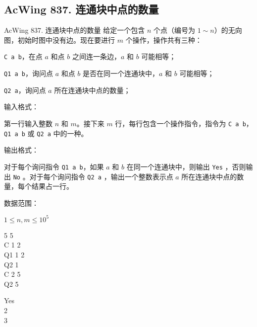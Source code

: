 \subsection{AcWing 837. 连通块中点的数量}

\begin{titledbox}{AcWing 837. 连通块中点的数量}
给定一个包含 $n$ 个点（编号为 $1 \sim n$）的无向图，初始时图中没有边。现在要进行 $m$ 个操作，操作共有三种：

\lstinline{C a b}，在点 $a$ 和点 $b$ 之间连一条边，$a$ 和 $b$ 可能相等；

\lstinline{Q1 a b}，询问点 $a$ 和点 $b$ 是否在同一个连通块中，$a$ 和 $b$ 可能相等；

\lstinline{Q2 a}，询问点 $a$ 所在连通块中点的数量；

输入格式：

第一行输入整数 $n$ 和 $m$。接下来 $m$ 行，每行包含一个操作指令，指令为 \lstinline{C a b}，\lstinline{Q1 a b} 或 \lstinline{Q2 a} 中的一种。

输出格式：

对于每个询问指令 \lstinline{Q1 a b}，如果 $a$ 和 $b$ 在同一个连通块中，则输出 \lstinline{Yes} ，否则输出 \lstinline{No} 。对于每个询问指令 \lstinline{Q2 a} ，输出一个整数表示点 $a$ 所在连通块中点的数量，每个结果占一行。

数据范围：

$1 \le n,m \le 10^5$
    
\begin{inputblock}
    5 5 \\
    C 1 2 \\
    Q1 1 2 \\
    Q2 1 \\
    C 2 5 \\
    Q2 5
\end{inputblock}
\begin{outputblock}
    Yes \\
    2 \\
    3
\end{outputblock}
\end{titledbox}

